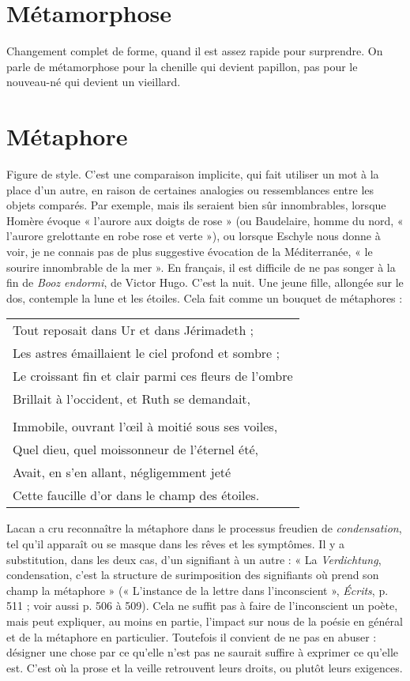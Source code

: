 \section{Métamorphose}
Changement complet de forme, quand il est assez
rapide pour surprendre. On parle de métamorphose
pour la chenille qui devient papillon, pas pour le nouveau-né qui devient un
vieillard.

\section{Métaphore}
Figure de style. C’est une comparaison implicite, qui fait utiliser
un mot à la place d’un autre, en raison de certaines analogies
ou ressemblances entre les objets comparés. Par exemple, mais ils seraient
bien sûr innombrables, lorsque Homère évoque « l'aurore aux doigts de rose »
(ou Baudelaire, homme du nord, « l’aurore grelottante en robe rose et verte »),
ou lorsque Eschyle nous donne à voir, je ne connais pas de plus suggestive évocation
de la Méditerranée, « le sourire innombrable de la mer ». En français, il
est difficile de ne pas songer à la fin de {\it Booz endormi}, de Victor Hugo. C’est la
nuit. Une jeune fille, allongée sur le dos, contemple la lune et les étoiles. Cela
fait comme un bouquet de métaphores :

{\footnotesize
\begin{center}
\begin{tabular}{l}
Tout reposait dans Ur et dans Jérimadeth ; \\
Les astres émaillaient le ciel profond et sombre ; \\
Le croissant fin et clair parmi ces fleurs de l'ombre \\
Brillait à l'occident, et Ruth se demandait, \\
 \\
Immobile, ouvrant l'œil à moitié sous ses voiles, \\
Quel dieu, quel moissonneur de l'éternel été, \\
Avait, en s’en allant, négligemment jeté \\
Cette faucille d’or dans le champ des étoiles. \\
\end{tabular}
\end{center}
}

Lacan a cru reconnaître la métaphore dans le processus freudien de {\it condensation},
tel qu’il apparaît ou se masque dans les rêves et les symptômes. Il y a
substitution, dans les deux cas, d’un signifiant à un autre : « La {\it Verdichtung},
condensation, c’est la structure de surimposition des signifiants où prend son
champ la métaphore » (« L’instance de la lettre dans l'inconscient », {\it Écrits},
p. 511 ; voir aussi p. 506 à 509). Cela ne suffit pas à faire de l’inconscient un
poète, mais peut expliquer, au moins en partie, l'impact sur nous de la poésie
en général et de la métaphore en particulier. Toutefois il convient de ne pas en
abuser : désigner une chose par ce qu’elle n’est pas ne saurait suffire à exprimer
ce qu’elle est. C’est où la prose et la veille retrouvent leurs droits, ou plutôt
leurs exigences.

